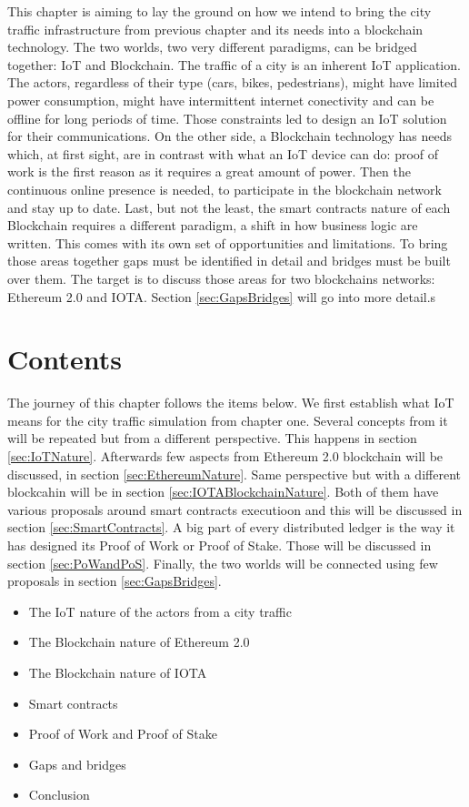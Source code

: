 \documentclass[a4paper,12pt,twoside]{book}
\begin{document}
    This chapter is aiming to lay the ground on how we intend to bring the city traffic infrastructure from previous chapter and its needs into a blockchain technology. The two worlds, two very different paradigms, can be bridged together: IoT and Blockchain. The traffic of a city is an inherent IoT application. The actors, regardless of their type (cars, bikes, pedestrians), might have limited power consumption, might have intermittent internet conectivity and can be offline for long periods of time. Those constraints led to design an IoT solution for their communications. On the other side, a Blockchain technology has needs which, at first sight, are in contrast with what an IoT device can do: proof of work is the first reason as it requires a great amount of power. Then the continuous online presence is needed, to participate in the blockchain network and stay up to date. Last, but not the least, the smart contracts nature of each Blockchain requires a different paradigm, a shift in how business logic are written. This comes with its own set of opportunities and limitations. To bring those areas together gaps must be identified in detail and bridges must be built over them. The target is to discuss those areas for two blockchains networks: Ethereum 2.0 and IOTA. Section \ref{sec:GapsBridges} will go into more detail.s

\section{Contents}
\label{sec:Contents}

    The journey of this chapter follows the items below. We first establish what IoT means for the city traffic simulation from chapter one. Several concepts from it will be repeated but from a different perspective. This happens in section \ref{sec:IoTNature}. Afterwards few aspects from Ethereum 2.0 blockchain will be discussed, in section \ref{sec:EthereumNature}. Same perspective but with a different blockcahin will be in section \ref{sec:IOTABlockchainNature}. Both of them have various proposals around smart contracts executioon and this will be discussed in section \ref{sec:SmartContracts}. A big part of every distributed ledger is the way it has designed its Proof of Work or Proof of Stake. Those will be discussed in section \ref{sec:PoWandPoS}. Finally, the two worlds will be connected using few proposals in section \ref{sec:GapsBridges}.

    \begin{itemize}
        \item The IoT nature of the actors from a city traffic
        \item The Blockchain nature of Ethereum 2.0
        \item The Blockchain nature of IOTA
        \item Smart contracts
        \item Proof of Work and Proof of Stake
        \item Gaps and bridges
        \item Conclusion
    \end{itemize}
\end{document}
